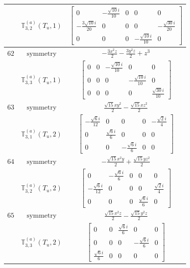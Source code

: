 \documentclass[fleqn,8pt,landscape]{jsarticle}
\begin{document}
\begin{longtable}{ccc}
$  $ & $ \mathbb{T}_{3,2}^{(a)}(T_{u},1) $ & $ \begin{bmatrix} 0 & - \frac{\sqrt{10} i}{10} & 0 & 0 & 0 \\ - \frac{3 \sqrt{10} i}{20} & 0 & 0 & 0 & - \frac{\sqrt{30} i}{20} \\ 0 & 0 & 0 & - \frac{\sqrt{10} i}{10} & 0 \end{bmatrix} $ \\ \hline
$ 62 $ & $ \text{symmetry} $ & $ - \frac{3 x^{2} z}{2} - \frac{3 y^{2} z}{2} + z^{3} $ \\
$  $ & $ \mathbb{T}_{3,3}^{(a)}(T_{u},1) $ & $ \begin{bmatrix} 0 & 0 & - \frac{\sqrt{10} i}{10} & 0 & 0 \\ 0 & 0 & 0 & - \frac{\sqrt{10} i}{10} & 0 \\ 0 & 0 & 0 & 0 & \frac{\sqrt{30} i}{10} \end{bmatrix} $ \\ \hline
$ 63 $ & $ \text{symmetry} $ & $ \frac{\sqrt{15} x y^{2}}{2} - \frac{\sqrt{15} x z^{2}}{2} $ \\
$  $ & $ \mathbb{T}_{3,1}^{(a)}(T_{u},2) $ & $ \begin{bmatrix} - \frac{\sqrt{6} i}{12} & 0 & 0 & 0 & - \frac{\sqrt{2} i}{4} \\ 0 & \frac{\sqrt{6} i}{6} & 0 & 0 & 0 \\ 0 & 0 & - \frac{\sqrt{6} i}{6} & 0 & 0 \end{bmatrix} $ \\ \hline
$ 64 $ & $ \text{symmetry} $ & $ - \frac{\sqrt{15} x^{2} y}{2} + \frac{\sqrt{15} y z^{2}}{2} $ \\
$  $ & $ \mathbb{T}_{3,2}^{(a)}(T_{u},2) $ & $ \begin{bmatrix} 0 & - \frac{\sqrt{6} i}{6} & 0 & 0 & 0 \\ - \frac{\sqrt{6} i}{12} & 0 & 0 & 0 & \frac{\sqrt{2} i}{4} \\ 0 & 0 & 0 & \frac{\sqrt{6} i}{6} & 0 \end{bmatrix} $ \\ \hline
$ 65 $ & $ \text{symmetry} $ & $ \frac{\sqrt{15} x^{2} z}{2} - \frac{\sqrt{15} y^{2} z}{2} $ \\
$  $ & $ \mathbb{T}_{3,3}^{(a)}(T_{u},2) $ & $ \begin{bmatrix} 0 & 0 & \frac{\sqrt{6} i}{6} & 0 & 0 \\ 0 & 0 & 0 & - \frac{\sqrt{6} i}{6} & 0 \\ \frac{\sqrt{6} i}{6} & 0 & 0 & 0 & 0 \end{bmatrix} $ \\ \hline

\end{longtable}
\end{document}
